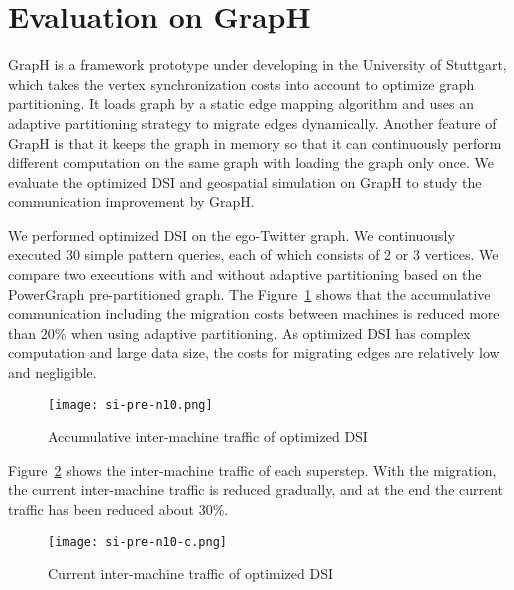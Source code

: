 \section{Evaluation on GrapH}

GrapH is a framework prototype under developing in the University of Stuttgart, which takes the vertex synchronization costs into account to optimize graph partitioning. It loads graph by a static edge mapping algorithm and uses an adaptive partitioning strategy to migrate edges dynamically. 
Another feature of GrapH is that it keeps the graph in memory so that it can continuously perform different computation on the same graph with loading the graph only once. We evaluate the optimized DSI and geospatial simulation on GrapH to study the communication improvement by GrapH.

We performed optimized DSI on the ego-Twitter graph. We continuously executed 30 simple pattern queries, each of which consists of 2 or 3 vertices. We compare two executions with and without adaptive partitioning based on the PowerGraph pre-partitioned graph. The Figure~\ref{fig:si-pre-n10} shows that the accumulative communication including the migration costs between machines is reduced more than 20\% when using adaptive partitioning. As optimized DSI has complex computation and large data size, the costs for migrating edges are relatively low and negligible.

\begin{figure}[H]
  \begin{center}
    \texttt{[image: si-pre-n10.png]}
    \caption{Accumulative inter-machine traffic of optimized DSI}
    \label{fig:si-pre-n10}
  \end{center}
\end{figure}

Figure~\ref{fig:si-pre-n10-c} shows the inter-machine traffic of each superstep. With the migration, the current inter-machine traffic is reduced gradually, and at the end the current traffic has been reduced about 30\%.

\begin{figure}[H]
  \begin{center}
    \texttt{[image: si-pre-n10-c.png]}
    \caption{Current inter-machine traffic of optimized DSI}
    \label{fig:si-pre-n10-c}
  \end{center}
\end{figure}

